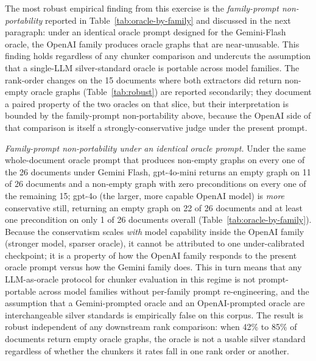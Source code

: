 \documentclass[make,article,submit,oneauthor,pdftex]{Definitions/mdpi}
\begin{document}
The most robust empirical finding from this exercise is the
\emph{family-prompt non-portability} reported in
Table~\ref{tab:oracle-by-family} and discussed in the next paragraph:
under an identical oracle prompt designed for the Gemini-Flash
oracle, the OpenAI family produces oracle graphs that are
near-unusable. This finding holds regardless of any chunker
comparison and undercuts the assumption that a single-LLM
silver-standard oracle is portable across model families. The
rank-order changes on the 15 documents where both extractors did
return non-empty oracle graphs (Table~\ref{tab:robust}) are reported
secondarily; they document a paired property of the two oracles on
that slice, but their interpretation is bounded by the family-prompt
non-portability above, because the OpenAI side of that comparison
is itself a strongly-conservative judge under the present prompt.

\emph{Family-prompt non-portability under an identical oracle
prompt.} Under the same whole-document oracle prompt that produces
non-empty graphs on every one of the 26 documents under Gemini Flash,
gpt-4o-mini returns an empty graph on 11 of 26 documents and a
non-empty graph with zero preconditions on every one of the
remaining 15; gpt-4o (the larger, more capable OpenAI model) is
\emph{more} conservative still, returning an empty graph on 22 of
26 documents and at least one precondition on only 1 of 26 documents
overall (Table~\ref{tab:oracle-by-family}). Because the conservatism
scales \emph{with} model capability inside the OpenAI family
(stronger model, sparser oracle), it cannot be attributed to one
under-calibrated checkpoint; it is a property of how the OpenAI
family responds to the present oracle prompt versus how the Gemini
family does. This in turn means that any LLM-as-oracle protocol for
chunker evaluation in this regime is not prompt-portable across model
families without per-family prompt re-engineering, and the assumption
that a Gemini-prompted oracle and an OpenAI-prompted oracle are
interchangeable silver standards is empirically false on this corpus.
The result is robust independent of any downstream rank comparison:
when 42\% to 85\% of documents return empty oracle graphs, the
oracle is not a usable silver standard regardless of whether the
chunkers it rates fall in one rank order or another.
\end{document}
